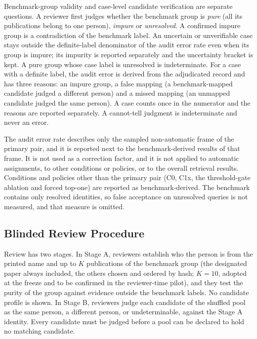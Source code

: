 Benchmark-group validity and case-level candidate verification are separate questions. A reviewer first judges whether the benchmark group is \emph{pure} (all its publications belong to one person), \emph{impure} or \emph{unresolved}. A confirmed impure group is a contradiction of the benchmark label. An uncertain or unverifiable case stays outside the definite-label denominator of the audit error rate even when its group is impure; its impurity is reported separately and the uncertainty bracket is kept. A pure group whose case label is unresolved is indeterminate. For a case with a definite label, the audit error is derived from the adjudicated record and has three reasons: an impure group, a false mapping (a benchmark-mapped candidate judged a different person) and a missed mapping (an unmapped candidate judged the same person). A case counts once in the numerator and the reasons are reported separately. A cannot-tell judgment is indeterminate and never an error.

The audit error rate describes only the sampled non-automatic frame of the primary pair, and it is reported next to the benchmark-derived results of that frame. It is not used as a correction factor, and it is not applied to automatic assignments, to other conditions or policies, or to the overall retrieval results. Conditions and policies other than the primary pair (C0, C1x, the threshold-gate ablation and forced top-one) are reported as benchmark-derived. The benchmark contains only resolved identities, so false acceptance on unresolved queries is not measured, and that measure is omitted.

\subsection{Blinded Review Procedure}
\label{sec:audit}
Review has two stages. In Stage A, reviewers establish who the person is from the printed name and up to $K$ publications of the benchmark group (the designated paper always included, the others chosen and ordered by hash; $K=10$, adopted at the freeze and to be confirmed in the reviewer-time pilot), and they test the purity of the group against evidence outside the benchmark labels. No candidate profile is shown. In Stage B, reviewers judge each candidate of the shuffled pool as the same person, a different person, or undeterminable, against the Stage A identity. Every candidate must be judged before a pool can be declared to hold no matching candidate.

